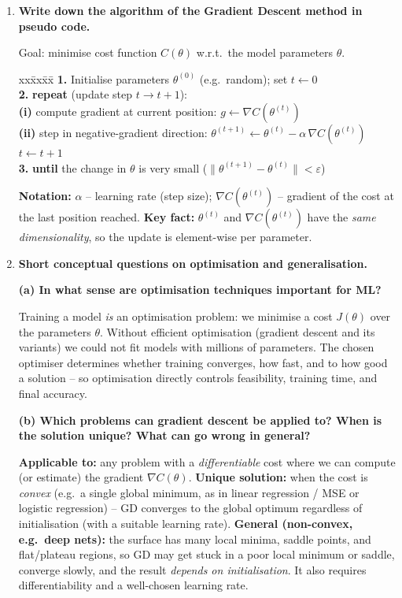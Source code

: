 \documentclass[10pt,a4paper]{article}
\newcommand{\q}[1]{\item #1}
\begin{document}
\begin{enumerate}[leftmargin=*,label=\textbf{Q\arabic*.}]
\q \textbf{Write down the algorithm of the Gradient Descent method in pseudo code.}
\begin{answerbox}
Goal: minimise cost function $C(\theta)$ w.r.t.\ the model parameters $\theta$.
\begin{tabbing}
xx\=xx\=xx\=\kill
\textbf{1.}\> Initialise parameters $\theta^{(0)}$ (e.g.\ random); set $t \leftarrow 0$ \\[2pt]
\textbf{2.}\> \textbf{repeat} (update step $t \to t+1$): \\
\> \textbf{(i)} compute gradient at current position: $g \leftarrow \nabla C(\theta^{(t)})$ \\
\> \textbf{(ii)} step in negative-gradient direction: $\theta^{(t+1)} \leftarrow \theta^{(t)} - \alpha\, \nabla C(\theta^{(t)})$ \\
\> \>\quad $t \leftarrow t+1$ \\[2pt]
\textbf{3.}\> \textbf{until} the change in $\theta$ is very small ($\lVert \theta^{(t+1)}-\theta^{(t)} \rVert < \varepsilon$)
\end{tabbing}
\textbf{Notation:} $\alpha$ -- learning rate (step size); $\nabla C(\theta^{(t)})$ -- gradient of the cost at the last position reached.
\textbf{Key fact:} $\theta^{(t)}$ and $\nabla C(\theta^{(t)})$ have the \emph{same dimensionality}, so the update is element-wise per parameter.
\end{answerbox}

\q \textbf{Short conceptual questions on optimisation and generalisation.}

\textbf{(a) In what sense are optimisation techniques important for ML?}
\begin{answerbox}
Training a model \emph{is} an optimisation problem: we minimise a cost $J(\theta)$ over the parameters $\theta$. Without efficient optimisation (gradient descent and its variants) we could not fit models with millions of parameters. The chosen optimiser determines whether training converges, how fast, and to how good a solution -- so optimisation directly controls feasibility, training time, and final accuracy.
\end{answerbox}

\textbf{(b) Which problems can gradient descent be applied to? When is the solution unique? What can go wrong in general?}
\begin{answerbox}
\textbf{Applicable to:} any problem with a \emph{differentiable} cost where we can compute (or estimate) the gradient $\nabla C(\theta)$.
\textbf{Unique solution:} when the cost is \emph{convex} (e.g.\ a single global minimum, as in linear regression / MSE or logistic regression) -- GD converges to the global optimum regardless of initialisation (with a suitable learning rate).
\textbf{General (non-convex, e.g.\ deep nets):} the surface has many local minima, saddle points, and flat/plateau regions, so GD may get stuck in a poor local minimum or saddle, converge slowly, and the result \emph{depends on initialisation}. It also requires differentiability and a well-chosen learning rate.
\end{answerbox}


\end{enumerate}
\end{document}
